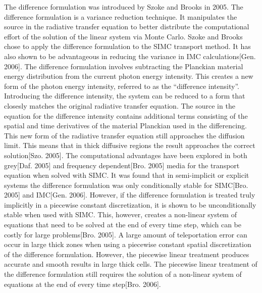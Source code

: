 \noindent
	\indent The difference formulation was introduced by Szoke and Brooks in 2005. The difference formulation is a variance reduction technique. It manipulates the source in the radiative transfer equation to better distribute the computational effort of the solution of the linear system via Monte Carlo. Szoke and Brooks chose to apply the difference formulation to the SIMC transport method. It has also shown to be advantageous in reducing the variance in IMC calculations[Gen. 2006]. The difference formulation involves subtracting the Planckian material energy distribution from the current photon energy intensity. This creates a new form of the photon energy intensity, referred to as the ``difference intensity''. Introducing the difference intensity, the system can be reduced to a form that closesly matches the original radiative transfer equation. The source in the equation for the difference intensity contains additional terms consisting of the spatial and time derivatives of the material Planckian used in the differencing. This new form of the radiative transfer equation still approaches the diffusion limit. This means that in thick diffusive regions the result approaches the correct solution[Szo. 2005]. The computational advantages have been explored in both grey[Daf. 2005] and frequency dependent[Bro. 2005] media for the transport equation when solved with SIMC. It was found that in semi-implicit or explicit systems the difference formulation was only conditionally stable for SIMC[Bro. 2005] and IMC[Gen. 2006]. However, if the difference formulation is treated truly implicitly in a piecewise constant discretization, it is shown to be unconditionally stable when used with SIMC. This, however, creates a non-linear system of equations that need to be solved at the end of every time step, which can be costly for large problems[Bro. 2005]. A large amount of teleportation error can occur in large thick zones when using a piecewise constant spatial discretization of the difference formulation. However, the piecewise linear treatment produces accurate and smooth results in large thick cells. The piecewise linear treatment of the difference formulation still requires the solution of a non-linear system of equations at the end of every time step[Bro. 2006].

\belowSubSecSkip

